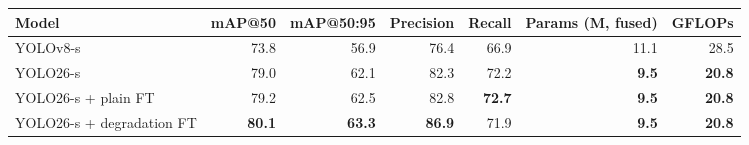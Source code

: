 \begin{tabular}{lrrrrrr}
\toprule
Model & mAP@50 & mAP@50:95 & Precision & Recall & Params (M, fused) & GFLOPs \\
\midrule
YOLOv8-s & 73.8 & 56.9 & 76.4 & 66.9 & 11.1 & 28.5 \\
YOLO26-s & 79.0 & 62.1 & 82.3 & 72.2 & \textbf{9.5} & \textbf{20.8} \\
YOLO26-s + plain FT & 79.2 & 62.5 & 82.8 & \textbf{72.7} & \textbf{9.5} & \textbf{20.8} \\
YOLO26-s + degradation FT & \textbf{80.1} & \textbf{63.3} & \textbf{86.9} & 71.9 & \textbf{9.5} & \textbf{20.8} \\
\bottomrule
\end{tabular}
